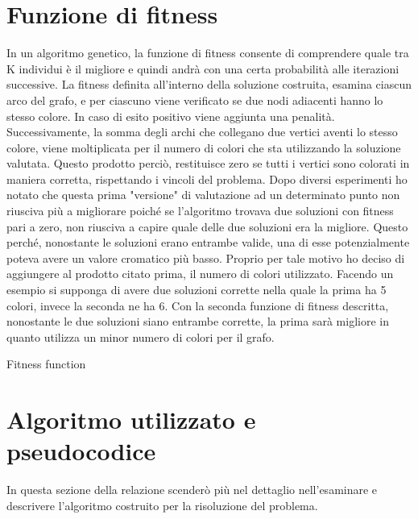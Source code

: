 \documentclass[12pt]{article}
\begin{document}
\begin{enumerate}
\section{Funzione di fitness}
In un algoritmo genetico, la funzione di fitness consente di comprendere quale tra K individui è il migliore e quindi andrà con una certa probabilità alle iterazioni successive. La fitness definita all'interno della soluzione costruita, esamina ciascun arco del grafo, e per ciascuno viene verificato se due nodi adiacenti hanno lo stesso colore. In caso di esito positivo viene aggiunta una penalità. Successivamente, la somma degli archi che collegano due vertici aventi lo stesso colore, viene moltiplicata per il numero di colori che sta utilizzando la soluzione valutata. Questo prodotto perciò, restituisce zero se tutti i vertici sono colorati in maniera corretta, rispettando i vincoli del problema. Dopo diversi esperimenti ho notato che questa prima "versione" di valutazione ad un determinato punto non riusciva più a migliorare poiché se l'algoritmo trovava due soluzioni con fitness pari a zero, non riusciva a capire quale delle due soluzioni era la migliore. Questo perché, nonostante le soluzioni erano entrambe valide, una di esse potenzialmente poteva avere un valore cromatico più basso. Proprio per tale motivo ho deciso di aggiungere al prodotto citato prima, il numero di colori utilizzato. Facendo un esempio si supponga di avere due soluzioni corrette nella quale la prima ha 5 colori, invece la seconda ne ha 6. Con la seconda funzione di fitness descritta, nonostante le due soluzioni siano entrambe corrette, la prima sarà migliore in quanto utilizza un minor numero di colori per il grafo.

\begin{algorithm}
\caption{Fitness function}\label{alg:cap}
\begin{algorithmic} 
            \State $count \gets count+1$
            \EndIf
        \EndFor
    \State \textbf{return} $(colors * count) + colors$}
\end{algorithmic}
\end{algorithm}

\section{Algoritmo utilizzato e pseudocodice}
In questa sezione della relazione scenderò più nel dettaglio nell'esaminare e descrivere l'algoritmo costruito per la risoluzione del problema.


\end{enumerate}
\end{document}
